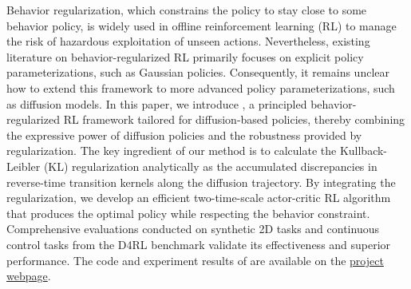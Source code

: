 Behavior regularization, which constrains the policy to stay close to some behavior policy, is widely used in offline reinforcement learning (RL) to manage the risk of hazardous exploitation of unseen actions. Nevertheless, existing literature on behavior-regularized RL primarily focuses on explicit policy parameterizations, such as Gaussian policies. Consequently, it remains unclear how to extend this framework to more advanced policy parameterizations, such as diffusion models. In this paper, we introduce \algbb, a principled behavior-regularized RL framework tailored for diffusion-based policies, thereby combining the expressive power of diffusion policies and the robustness provided by regularization. The key ingredient of our method is to calculate the Kullback-Leibler (KL) regularization analytically as the accumulated discrepancies in reverse-time transition kernels along the diffusion trajectory. By integrating the regularization, we develop an efficient two-time-scale actor-critic RL algorithm that produces the optimal policy while respecting the behavior constraint. Comprehensive evaluations conducted on synthetic 2D tasks and continuous control tasks from the D4RL benchmark validate its effectiveness and superior performance. The code and experiment results of \algbb are available on the \href{https://ai.gaocx.io/bdpo}{project webpage}.